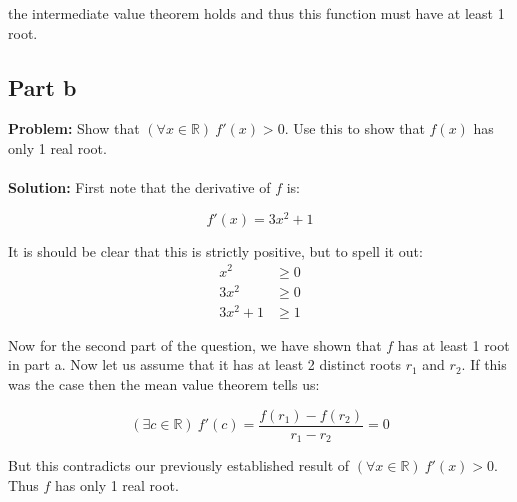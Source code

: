 \documentclass{article}
\begin{document}
the intermediate value theorem holds and thus this function must have at least 1 root.

\subsection*{Part b}
\textbf{Problem:} Show that $(\forall x\in\mathbb R)\ f'(x)>0$. Use this to show that $f(x)$ has only 1 real root.
\\\\
\textbf{Solution:} First note that the derivative of $f$ is:

$$f'(x)=3x^2+1$$

It is should be clear that this is strictly positive, but to spell it out:
\begin{align*}
  x^2&\ge 0\tag{even-valued exponentiation}\\
  3x^2&\ge 0\tag{ordered field multiplication}\\
  3x^2+1&\ge 1\tag{ordered field addition}
\end{align*}

Now for the second part of the question, we have shown that $f$ has at least 1 root in part a. Now let us assume that it has at least 2 distinct roots $r_1$ and $r_2$. If this was the case then the mean value theorem tells us:

$$(\exists c\in\mathbb R)\ f'(c)=\frac{f(r_1)-f(r_2)}{r_1-r_2}=0$$

But this contradicts our previously established result of $(\forall x\in\mathbb R)\ f'(x)>0$. Thus $f$ has only 1 real root.
\end{document}
